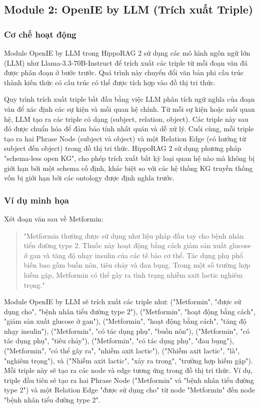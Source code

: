 \subsection{Module 2: OpenIE by LLM (Trích xuất Triple)}

\subsubsection{Cơ chế hoạt động}
Module OpenIE by LLM trong HippoRAG 2 sử dụng các mô hình ngôn ngữ lớn (LLM) như Llama-3.3-70B-Instruct để trích xuất các triple từ mỗi đoạn văn đã được phân đoạn ở bước trước. Quá trình này chuyển đổi văn bản phi cấu trúc thành kiến thức có cấu trúc có thể được tích hợp vào đồ thị tri thức.

Quy trình trích xuất triple bắt đầu bằng việc LLM phân tích ngữ nghĩa của đoạn văn để xác định các sự kiện và mối quan hệ chính. Từ mỗi sự kiện hoặc mối quan hệ, LLM tạo ra các triple có dạng (subject, relation, object). Các triple này sau đó được chuẩn hóa để đảm bảo tính nhất quán và dễ xử lý. Cuối cùng, mỗi triple tạo ra hai Phrase Node (subject và object) và một Relation Edge (có hướng từ subject đến object) trong đồ thị tri thức. HippoRAG 2 sử dụng phương pháp "schema-less open KG", cho phép trích xuất bất kỳ loại quan hệ nào mà không bị giới hạn bởi một schema cố định, khác biệt so với các hệ thống KG truyền thống vốn bị giới hạn bởi các ontology được định nghĩa trước.

\subsubsection{Ví dụ minh họa}
Xét đoạn văn sau về Metformin:

\begin{quote}
"Metformin thường được sử dụng như liệu pháp đầu tay cho bệnh nhân tiểu đường type 2. Thuốc này hoạt động bằng cách giảm sản xuất glucose ở gan và tăng độ nhạy insulin của các tế bào cơ thể. Tác dụng phụ phổ biến bao gồm buồn nôn, tiêu chảy và đau bụng. Trong một số trường hợp hiếm gặp, Metformin có thể gây ra tình trạng nhiễm axit lactic nghiêm trọng."
\end{quote}

Module OpenIE by LLM sẽ trích xuất các triple như: ("Metformin", "được sử dụng cho", "bệnh nhân tiểu đường type 2"), ("Metformin", "hoạt động bằng cách", "giảm sản xuất glucose ở gan"), ("Metformin", "hoạt động bằng cách", "tăng độ nhạy insulin"), ("Metformin", "có tác dụng phụ", "buồn nôn"), ("Metformin", "có tác dụng phụ", "tiêu chảy"), ("Metformin", "có tác dụng phụ", "đau bụng"), ("Metformin", "có thể gây ra", "nhiễm axit lactic"), ("Nhiễm axit lactic", "là", "nghiêm trọng"), và ("Nhiễm axit lactic", "xảy ra trong", "trường hợp hiếm gặp"). Mỗi triple này sẽ tạo ra các node và edge tương ứng trong đồ thị tri thức. Ví dụ, triple đầu tiên sẽ tạo ra hai Phrase Node ("Metformin" và "bệnh nhân tiểu đường type 2") và một Relation Edge "được sử dụng cho" từ node "Metformin" đến node "bệnh nhân tiểu đường type 2".

